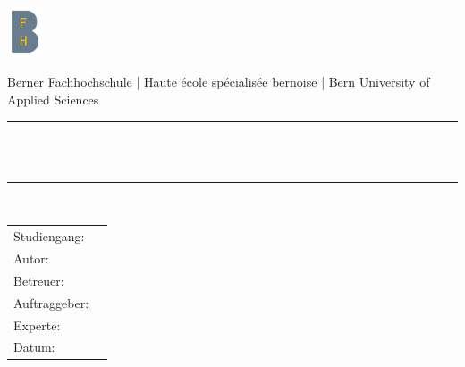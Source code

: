 \begin{titlepage}
\begin{center}

\includegraphics[width=0.08\textwidth]{img/logo/bfh_logo.png}

Berner Fachhochschule | Haute école spécialisée bernoise | Bern University of Applied Sciences
\vspace{20mm}

\newcommand{\HRule}{\rule{\linewidth}{0.3mm}}
\HRule \\[0.4cm]
{\huge \titel}\\[0.3cm]
{\huge \bfseries  }
\HRule \\[2cm]


\vfill
\end{center}
\begin{tabular}{ll}
	Studiengang:  & \studiengang 	\\
	Autor:        & \autor 		\\
	Betreuer:     & \betreuer	\\
	Auftraggeber: & \auftraggeber	\\
	Experte:      & \experte	\\
	Datum:        & \datum		\\
\end{tabular}

\end{titlepage}
